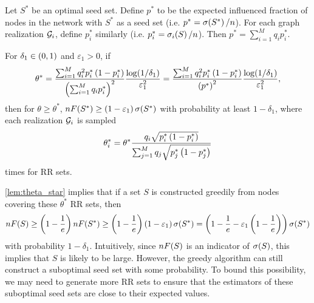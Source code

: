 \documentclass[11pt]{article}
\begin{document}
Let $S^{\ast}$ be an optimal seed set. Define $p^{\ast}$ to be the expected influenced fraction of nodes in the network with $S^{\ast}$ as a seed set 
(i.e.\! $p^{\ast} = \f[\sigma]{S^{\ast}} / n$). For each graph realization $\calG_i$, define $p_i^{\ast}$ similarly (i.e.\! $p_i^{\ast} = \f[\sigma_i]{S} / n$). 
Then $p^{\ast} = \sum_{i=1}^{M} q_i p_i^{\ast}$. 

\begin{lemma}
    For $\delta_1 \in \lrp{0, 1}$ and $\varepsilon_1 > 0$, if 
    \begin{equation}
        \theta^{\ast} = \frac{\sum_{i=1}^{M} q_i^2 p_i^{\ast} \lrp{1 - p_i^{\ast}}}{\lrp{\sum_{i=1}^{M} q_i p_i^{\ast}}^2} \frac{\f[\log]{1 / \delta_1}}{\varepsilon_1^2}
        = \frac{\sum_{i=1}^{M} q_i^2 p_i^{\ast} \lrp{1 - p_i^{\ast}}}{\lrp{p^{\ast}}^2} \frac{\f[\log]{1 / \delta_1}}{\varepsilon_1^2},
        \label{eq:theta_star}
    \end{equation}
    then for $\theta \geq \theta^{\ast}$, $n\f[F]{S^{\ast}} \geq \lrp{1 - \varepsilon_1}\f[\sigma]{S^{\ast}}$ with probability at least $1 - \delta_1$, where each realization $\calG_i$ is sampled 
    \begin{equation}
        \theta_i^{\ast} = \theta^{\ast} \frac{q_i \sqrt{p_i^{\ast} \lrp{1 - p_i^{\ast}} }}{\sum_{j=1}^{M} q_j \sqrt{p_j^{\ast} \lrp{1 - p_j^{\ast}} }}
        \label{eq:theta_star_i}
    \end{equation}
    times for RR sets. 
    \label{lem:theta_star}
\end{lemma}

\cref{lem:theta_star} implies that if a set $S$ is constructed greedily from nodes covering these $\theta^{\ast}$ RR sets, then 
\begin{equation*}
    n\f[F]{S} \geq \lrp{1 - \frac{1}{e}} n \f[F]{S^{\ast}} \geq \lrp{1 - \frac{1}{e}} \lrp{1 - \varepsilon_1} \f[\sigma]{S^*} = \lrp{1 - \frac{1}{e} - \varepsilon_1 \lrp{1 - \frac{1}{e}}} \f[\sigma]{S^{\ast}}
\end{equation*}
with probability $1 - \delta_1$. Intuitively, since $n \f[F]{S}$ is an indicator of $\f[\sigma]{S}$, this implies that $S$ is likely to be large. 
However, the greedy algorithm can still construct a suboptimal seed set with some probability. 
To bound this possibility, we may need to generate more RR sets to ensure that the estimators of these suboptimal seed sets are 
close to their expected values. 
\end{document}
